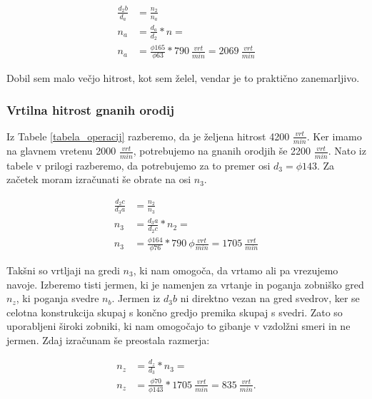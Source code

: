 \begin{equation}
	\label{eq:9}
	\begin{split}
		\frac{d_2b}{d_a} &= \frac{n_2}{n_a} \\
		n_a &= \frac{d_a}{d_2} * n = \\
		n_a &= \frac{\phi 165}{\phi 63} * 790\ \frac{vrt}{min} = 2069\ \frac{vrt}{min}
	\end{split}
\end{equation}

Dobil sem malo večjo hitrost, kot sem želel, vendar je to praktično zanemarljivo.

\subsubsection{Vrtilna hitrost gnanih orodij}
Iz Tabele \ref{tabela_operacij} razberemo, da je željena hitrost 4200 \(\frac{vrt}{min}\).
Ker imamo na glavnem vretenu 2000 \(\frac{vrt}{min}\), potrebujemo na gnanih orodjih
še 2200 \(\frac{vrt}{min}\). Nato iz tabele  v prilogi
razberemo, da potrebujemo za to premer osi \(d_3 = \phi 143\). Za začetek moram izračunati še obrate na osi \(n_3\).

\begin{equation}
	\label{eq:10}
	\begin{split}
		\frac{d_2c}{d_3a} &= \frac{n_2}{n_3} \\
		n_3 &= \frac{d_3a}{d_2c} * n_2 = \\
		n_3 &= \frac{\phi 164}{\phi 76} * 790\ \phi \frac{vrt}{min} = 1705\ \frac{vrt}{min}
	\end{split}
\end{equation}

Takšni so vrtljaji na gredi \(n_3\), ki nam omogoča, da vrtamo ali pa vrezujemo navoje.
Izberemo tisti jermen, ki je namenjen za vrtanje in poganja zobniško gred \(n_z\), ki
poganja svedre \(n_b\). Jermen iz \(d_3b\) ni direktno vezan na gred svedrov,
ker se celotna konstrukcija skupaj s končno gredjo premika skupaj s
svedri. Zato so uporabljeni široki zobniki, ki nam omogočajo to gibanje
v vzdolžni smeri in ne jermen. Zdaj izračunam še preostala razmerja:

\begin{equation}
	\label{eq:11}
	\begin{split}
		n_z &= \frac{d_z}{d_3} * n_3 = \\
		n_z &= \frac{\phi 70}{\phi 143} * 1705\ \frac{vrt}{min} = 835\ \frac{vrt}{min}.
	\end{split}
\end{equation}

